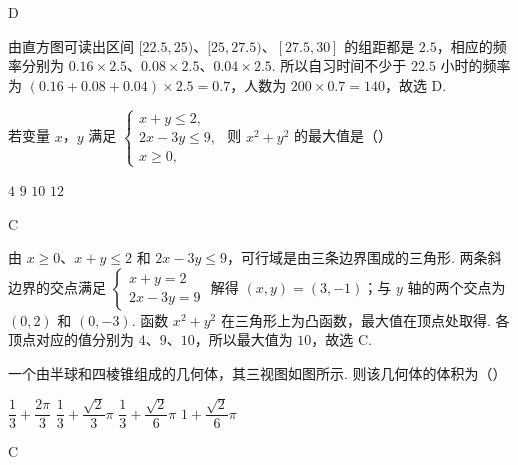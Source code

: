 \begin{answer}
D
\end{answer}

\begin{solution}
由直方图可读出区间 \([22.5,25)\)、\([25,27.5)\)、\([27.5,30]\) 的组距都是 \(2.5\)，相应的频率分别为 \(0.16\times2.5\)、\(0.08\times2.5\)、\(0.04\times2.5\). 所以自习时间不少于 \(22.5\) 小时的频率为 \((0.16+0.08+0.04)\times2.5=0.7\)，人数为 \(200\times0.7=140\)，故选 D.
\end{solution}

\begin{problem}
若变量 \(x\)，\(y\) 满足
\(\begin{cases}
x+y\leq 2,\\
2x-3y\leq 9,\\
x\geq 0,
\end{cases}\)
则 \(x^2+y^2\) 的最大值是（\quad）

\choices
    {\(4\)}
    {\(9\)}
    {\(10\)}
    {\(12\)}
\end{problem}

\begin{answer}
C
\end{answer}

\begin{solution}
由 \(x\geq0\)、\(x+y\leq2\) 和 \(2x-3y\leq9\)，可行域是由三条边界围成的三角形. 两条斜边界的交点满足
\(\begin{cases}
x+y=2\\
2x-3y=9
\end{cases}\)
解得 \((x,y)=(3,-1)\)；与 \(y\) 轴的两个交点为 \((0,2)\) 和 \((0,-3)\). 函数 \(x^2+y^2\) 在三角形上为凸函数，最大值在顶点处取得. 各顶点对应的值分别为 \(4\)、\(9\)、\(10\)，所以最大值为 \(10\)，故选 C.
\end{solution}

\begin{problem}
一个由半球和四棱锥组成的几何体，其三视图如图所示. 则该几何体的体积为（\quad）


\choices
    {\(\dfrac13+\dfrac{2\pi}{3}\)}
    {\(\dfrac13+\dfrac{\sqrt2}{3}\pi\)}
    {\(\dfrac13+\dfrac{\sqrt2}{6}\pi\)}
    {\(1+\dfrac{\sqrt2}{6}\pi\)}
\end{problem}

\begin{answer}
C
\end{answer}

